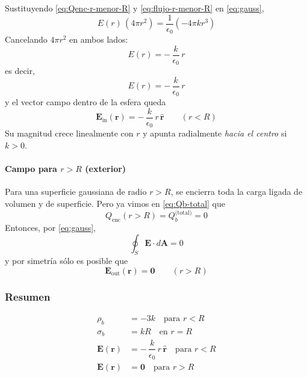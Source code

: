 \documentclass{article}
\begin{document}
Sustituyendo \eqref{eq:Qenc-r-menor-R} y \eqref{eq:flujo-r-menor-R} en \eqref{eq:gauss},
\begin{equation}
E(r)\,(4\pi r^{2}) = \frac{1}{\epsilon_{0}}\left(-4\pi k r^{3}\right)
\label{eq:gauss-interior-paso}
\end{equation}
Cancelando $4\pi r^{2}$ en ambos lados:
\[
E(r) = -\,\frac{k}{\epsilon_{0}}\,r
\]
es decir,
\begin{equation}
E(r) = -\,\frac{k}{\epsilon_{0}}\,r
\label{eq:E-magn-interior}
\end{equation}
y el vector campo dentro de la esfera queda
\begin{equation}
\mathbf{E}_{\text{in}}(\mathbf{r}) = -\,\frac{k}{\epsilon_{0}}\,r\,\hat{\mathbf{r}}
\qquad (r < R)
\label{eq:E-vector-interior}
\end{equation}
Su magnitud crece linealmente con $r$ y apunta radialmente \emph{hacia el centro} si $k>0$.

\paragraph{Campo para $r > R$ (exterior)}

Para una superficie gaussiana de radio $r>R$, se encierra toda la carga ligada de volumen y de superficie. Pero ya vimos en \eqref{eq:Qb-total} que
\begin{equation}
Q_{\text{enc}}(r>R) = Q_{b}^{\text{(total)}} = 0
\label{eq:Qenc-mayor-R}
\end{equation}
Entonces, por \eqref{eq:gauss},
\begin{equation}
\oint_{S} \mathbf{E}\cdot d\mathbf{A} = 0
\label{eq:gauss-exterior}
\end{equation}
y por simetría sólo es posible que
\begin{equation}
\mathbf{E}_{\text{out}}(\mathbf{r}) = \mathbf{0}
\qquad (r > R)
\label{eq:E-exterior}
\end{equation}

\subsubsection*{Resumen}

\begin{align}
\rho_{b} &= -3k \quad \text{para } r < R \\
\sigma_{b} &= kR \quad \text{en } r = R \\
\mathbf{E}(\mathbf{r}) &= -\,\dfrac{k}{\epsilon_{0}}\,r\,\hat{\mathbf{r}} 
\quad \text{para } r < R \\
\mathbf{E}(\mathbf{r}) &= \mathbf{0} \quad \text{para } r > R
\end{align}
\end{document}
